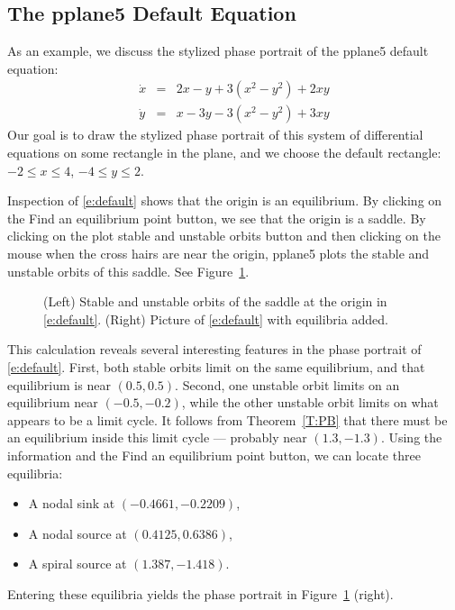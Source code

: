 \documentclass{ximera}
\begin{document}
\subsection*{The {\sf pplane5} Default Equation}

As an example, we discuss the stylized phase portrait of the 
{\sf pplane5} default equation:
\begin{equation}  \label{e:default}
\begin{array}{rcl}
\dot{x} & = & 2x-y+3(x^2-y^2)+2xy \\
\dot{y} & = & x-3y-3(x^2-y^2)+3xy
\end{array}
\end{equation} 
Our goal is to draw the stylized phase portrait of this system
of differential equations on some rectangle in the plane, and we
choose the default rectangle: $-2\leq x\leq 4$, $-4\leq y\leq 2$.

Inspection of \eqref{e:default} shows that the origin 
is an equilibrium.  By clicking on the {\sf Find an equilibrium point}
button, we see that the origin is a saddle.  By clicking on the
{\sf plot stable and unstable orbits} button and then clicking
on the mouse when the cross hairs are near the origin, {\sf
pplane5} plots the stable and unstable orbits of this saddle.
See Figure~\ref{F:default0}.

\begin{figure}[htb]
           \centerline{%
	   }
           \caption{(Left) Stable and unstable orbits of the saddle at
		the origin in \protect\eqref{e:default}. (Right) Picture 
		of \protect\eqref{e:default} with equilibria added.}
           \label{F:default0}
\end{figure}
 
This calculation reveals several interesting features in the
phase portrait of \eqref{e:default}.  First, both stable orbits limit on the 
same equilibrium, and that equilibrium is near $(0.5,0.5)$.  Second, one 
unstable orbit limits on an equilibrium near $(-0.5,-0.2)$, while the other 
unstable orbit limits on what appears to be a limit cycle.  It follows from 
Theorem~\ref{T:PB} that there must be an equilibrium inside this limit cycle 
--- probably near $(1.3,-1.3)$.  Using the information and the {\sf
Find an equilibrium point} button, we can locate three
equilibria:
\begin{itemize}
\item	A nodal sink at $(-0.4661,-0.2209)$,
\item	A nodal source at $(0.4125,0.6386)$,
\item	A spiral source at $(1.387,-1.418)$. 
\end{itemize}
Entering these equilibria yields the phase portrait in 
Figure~\ref{F:default0} (right). 
\end{document}

